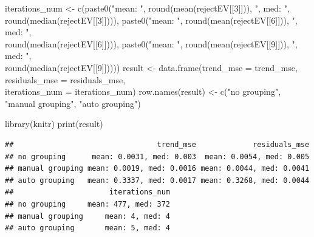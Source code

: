 \documentclass[specialist,
               substylefile = spbu_report.rtx,
               subf,href,colorlinks=true, 12pt]{disser}
\theoremstyle{definition}
\newenvironment{Shaded}{\begin{snugshade}}{\end{snugshade}}
\newcommand{\AttributeTok}[1]{\textcolor[rgb]{0.77,0.63,0.00}{#1}}
\newcommand{\DecValTok}[1]{\textcolor[rgb]{0.00,0.00,0.81}{#1}}
\newcommand{\FunctionTok}[1]{\textcolor[rgb]{0.00,0.00,0.00}{#1}}
\newcommand{\NormalTok}[1]{#1}
\newcommand{\OtherTok}[1]{\textcolor[rgb]{0.56,0.35,0.01}{#1}}
\newcommand{\StringTok}[1]{\textcolor[rgb]{0.31,0.60,0.02}{#1}}
\begin{document}
\begin{Shaded}
\begin{Highlighting}[]
\NormalTok{  iterations\_num }\OtherTok{\textless{}{-}} \FunctionTok{c}\NormalTok{(}\FunctionTok{paste0}\NormalTok{(}\StringTok{"mean: "}\NormalTok{, }\FunctionTok{round}\NormalTok{(}\FunctionTok{mean}\NormalTok{(rejectEV[[}\DecValTok{3}\NormalTok{]])), }\StringTok{", med: "}\NormalTok{, }
\\ \FunctionTok{round}\NormalTok{(}\FunctionTok{median}\NormalTok{(rejectEV[[}\DecValTok{3}\NormalTok{]]))),}
                     \FunctionTok{paste0}\NormalTok{(}\StringTok{"mean: "}\NormalTok{, }\FunctionTok{round}\NormalTok{(}\FunctionTok{mean}\NormalTok{(rejectEV[[}\DecValTok{6}\NormalTok{]])), }\StringTok{", med: "}\NormalTok{, }
                     \\ \FunctionTok{round}\NormalTok{(}\FunctionTok{median}\NormalTok{(rejectEV[[}\DecValTok{6}\NormalTok{]]))),}
                     \FunctionTok{paste0}\NormalTok{(}\StringTok{"mean: "}\NormalTok{, }\FunctionTok{round}\NormalTok{(}\FunctionTok{mean}\NormalTok{(rejectEV[[}\DecValTok{9}\NormalTok{]])), }\StringTok{", med: "}\NormalTok{, }
                     \\ \FunctionTok{round}\NormalTok{(}\FunctionTok{median}\NormalTok{(rejectEV[[}\DecValTok{9}\NormalTok{]]))))}
\NormalTok{  result }\OtherTok{\textless{}{-}} \FunctionTok{data.frame}\NormalTok{(}\AttributeTok{trend\_mse =}\NormalTok{ trend\_mse, }\AttributeTok{residuals\_mse =}\NormalTok{ residuals\_mse, }
\\ \AttributeTok{iterations\_num =}\NormalTok{ iterations\_num)}
  \FunctionTok{row.names}\NormalTok{(result) }\OtherTok{\textless{}{-}} \FunctionTok{c}\NormalTok{(}\StringTok{"no grouping"}\NormalTok{, }\StringTok{"manual grouping"}\NormalTok{, }\StringTok{"auto grouping"}\NormalTok{)}
  
  \FunctionTok{library}\NormalTok{(knitr)}
  \FunctionTok{print}\NormalTok{(result)}
\end{Highlighting}
\end{Shaded}

\begin{verbatim}
##                                 trend_mse             residuals_mse
## no grouping      mean: 0.0031, med: 0.003  mean: 0.0054, med: 0.005
## manual grouping mean: 0.0019, med: 0.0016 mean: 0.0044, med: 0.0041
## auto grouping   mean: 0.3337, med: 0.0017 mean: 0.3268, med: 0.0044
##                      iterations_num
## no grouping     mean: 477, med: 372
## manual grouping     mean: 4, med: 4
## auto grouping       mean: 5, med: 4
\end{verbatim}
\end{document}
